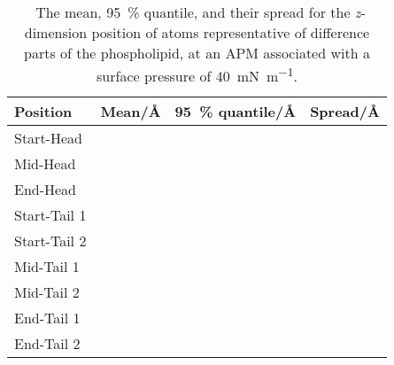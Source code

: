 %
%
\begin{table}
\centering
\small
  \caption{\ The mean, \SI{95}{\percent} quantile, and their spread for the \emph{z}-dimension position of atoms representative of difference parts of the phospholipid, at an APM associated with a surface pressure of \SI{40}{\milli\newton\per\meter}.}
  \label{tab:spread3}
  \begin{tabular}{llll}
    \toprule
    Position & Mean/\si{\angstrom} & \SI{95}{\percent} quantile/\si{\angstrom} & Spread/\si{\angstrom} \\
    \midrule
    Start-Head &  &  &  \\
    Mid-Head &  &  &  \\
    End-Head &  &  &  \\
    \midrule
    Start-Tail 1 &  &  &  \\
    Start-Tail 2 &  &  &  \\
    Mid-Tail 1 &  &  &  \\
    Mid-Tail 2 &  &  &  \\
    End-Tail 1 &  &  &  \\
    End-Tail 2 &  &  &  \\
    \bottomrule
  \end{tabular}
\end{table}
